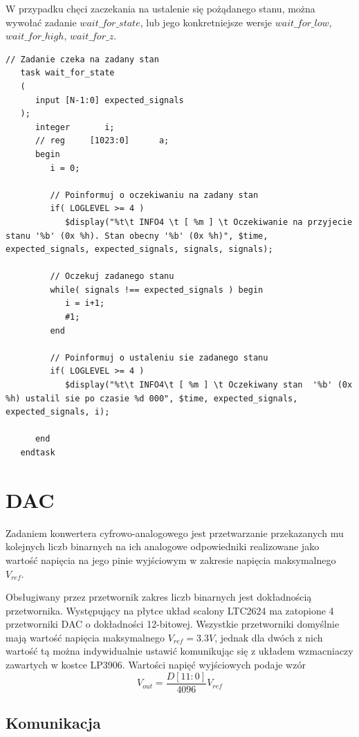 \documentclass[a4paper,12pt]{article}
\begin{document}
W przypadku chęci zaczekania na ustalenie się pożądanego stanu, można wywołać zadanie $wait\_for\_state$, lub jego konkretniejsze wersje $wait\_for\_low$, $wait\_for\_high$, $wait\_for\_z$.
\begin{lstlisting}[label=Monitor,caption=Monitor.v,firstnumber=231]
   // Zadanie czeka na zadany stan
   task wait_for_state
   (
      input [N-1:0] expected_signals
   );
      integer       i;
      // reg     [1023:0]      a;
      begin
         i = 0;

         // Poinformuj o oczekiwaniu na zadany stan
         if( LOGLEVEL >= 4 )
            $display("%t\t INFO4 \t [ %m ] \t Oczekiwanie na przyjecie stanu '%b' (0x %h). Stan obecny '%b' (0x %h)", $time, expected_signals, expected_signals, signals, signals);

         // Oczekuj zadanego stanu
         while( signals !== expected_signals ) begin
            i = i+1;
            #1;
         end

         // Poinformuj o ustaleniu sie zadanego stanu
         if( LOGLEVEL >= 4 )
            $display("%t\t INFO4\t [ %m ] \t Oczekiwany stan  '%b' (0x %h) ustalil sie po czasie %d 000", $time, expected_signals, expected_signals, i);

      end
   endtask
\end{lstlisting}



\newpage
\section{DAC}
Zadaniem konwertera cyfrowo-analogowego jest przetwarzanie przekazanych mu kolejnych liczb binarnych na ich analogowe odpowiedniki realizowane jako wartość napięcia na jego pinie wyjściowym w zakresie napięcia maksymalnego $V_{ref}$.

Obsługiwany przez przetwornik zakres liczb binarnych jest dokładnością przetwornika. Występujący na płytce układ scalony LTC2624 ma zatopione 4 przetworniki DAC o dokładności 12-bitowej. Wszystkie przetworniki domyślnie mają wartość napięcia maksymalnego $V_{ref} = 3.3V$, jednak dla dwóch z nich wartość tą można indywidualnie ustawić komunikując się z układem wzmacniaczy zawartych w kostce LP3906. Wartości napięć wyjściowych podaje wzór
$$V_{out} = \frac{D[11:0]}{4096}  V_{ref}$$

\subsection{Komunikacja}
\end{document}
